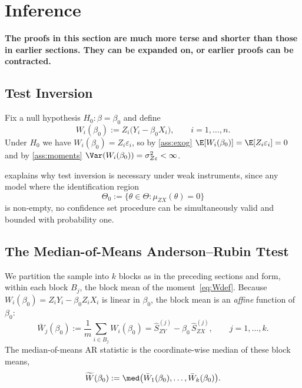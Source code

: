 \section{Inference}
\label{s:inference}

\textbf{The proofs in this section are much more terse and shorter than those in earlier sections. They can be expanded on, or earlier proofs can be contracted.}

\subsection{Test Inversion}
\label{ss:inversion}

Fix a null hypothesis $H_0\colon \beta = \beta_0$ and define
\begin{equation}
  W_i(\beta_0) := Z_i\bigl(Y_i - \beta_0 X_i\bigr), \qquad i = 1,\dots,n.
  \label{eq:Wdef}
\end{equation}
Under $H_0$ we have $W_i(\beta_0) = Z_i\varepsilon_i$, so by \ref{ass:exog} $\E[W_i(\beta_0)] = \E[Z_i\varepsilon_i] = 0$ and by \ref{ass:moments} $\Var(W_i(\beta_0)) = \sigma_{Z\varepsilon}^2 < \infty$.

\citet{dufour1997some} exaplains why test inversion is necessary under weak instruments, since any model where the identification region
\[
  \Theta_0 := \{\theta\in\Theta : \mu_{ZX}(\theta) = 0\}
\]
is non-empty, no confidence set procedure can be simultaneously valid and bounded with probability one.

\subsection{The Median-of-Means Anderson--Rubin Ttest}
\label{sec:mom_ar_test}

We partition the sample into $k$ blocks as in the preceding sections and form, within each block $B_j$, the block mean of the moment~\eqref{eq:Wdef}. Because $W_i(\beta_0) = Z_iY_i - \beta_0 Z_iX_i$ is linear in $\beta_0$, the block mean is
an \emph{affine} function of $\beta_0$:
\begin{equation}
  \bar{W}_j(\beta_0)
    := \frac{1}{m}\sum_{i\in B_j} W_i(\beta_0)
    = \hat{S}_{ZY}^{(j)} - \beta_0\,\hat{S}_{ZX}^{(j)},
    \qquad j = 1,\dots,k.
  \label{eq:Wbar}
\end{equation}
The median-of-means AR statistic is the coordinate-wise median of these block
means,
\begin{equation}
  \widetilde{W}(\beta_0)
    := \med\bigl(\bar{W}_1(\beta_0),\dots,\bar{W}_k(\beta_0)\bigr).
  \label{eq:Wtilde}
\end{equation}


